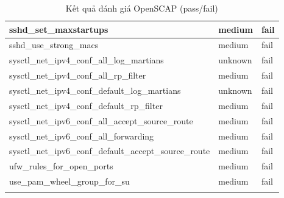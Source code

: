 \begin{longtable}{|p{10cm}|p{2cm}|p{2cm}|}
\hline
sshd\_set\_maxstartups & medium & fail \\
\hline
sshd\_use\_strong\_macs & medium & fail \\
\hline
sysctl\_net\_ipv4\_conf\_all\_log\_martians & unknown & fail \\
\hline
sysctl\_net\_ipv4\_conf\_all\_rp\_filter & medium & fail \\
\hline
sysctl\_net\_ipv4\_conf\_default\_log\_martians & unknown & fail \\
\hline
sysctl\_net\_ipv4\_conf\_default\_rp\_filter & medium & fail \\
\hline
sysctl\_net\_ipv6\_conf\_all\_accept\_source\_route & medium & fail \\
\hline
sysctl\_net\_ipv6\_conf\_all\_forwarding & medium & fail \\
\hline
sysctl\_net\_ipv6\_conf\_default\_accept\_source\_route & medium & fail \\
\hline
ufw\_rules\_for\_open\_ports & medium & fail \\
\hline
use\_pam\_wheel\_group\_for\_su & medium & fail \\
\hline
\caption{Kết quả đánh giá OpenSCAP (pass/fail)} \label{tab:openscap-all-results}
\end{longtable}